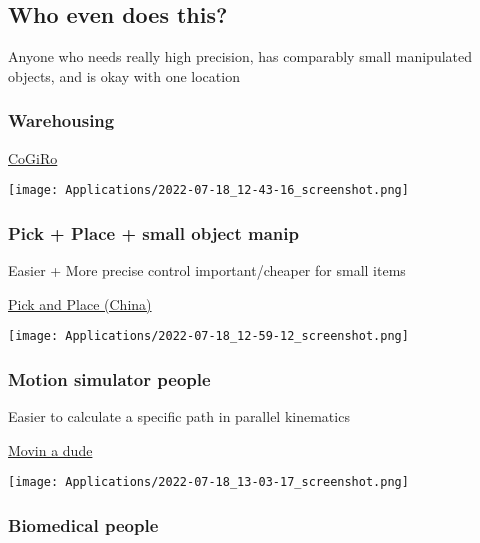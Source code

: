 \documentclass[11pt]{article}
\begin{document}
\subsection{Who even does this?}
\label{sec:org94c303a}

Anyone who needs really high precision, has comparably small manipulated objects, and is okay with one location


\subsubsection{Warehousing}
\label{sec:orgeb9c583}

\href{https://www.youtube.com/watch?v=2b4YwFZhtIE}{CoGiRo}

\begin{center}
\texttt{[image: Applications/2022-07-18\_12-43-16\_screenshot.png]}
\end{center}

\subsubsection{Pick + Place + small object manip}
\label{sec:orgdbc0c7f}

Easier + More precise control important/cheaper for small items

\href{https://www.youtube.com/watch?v=QFZMhsVn\_CE}{Pick and Place (China)}

\begin{center}
\texttt{[image: Applications/2022-07-18\_12-59-12\_screenshot.png]}
\end{center}

\subsubsection{Motion simulator people}
\label{sec:org82d6322}

Easier to calculate a specific path in parallel kinematics

\href{https://www.youtube.com/watch?v=9KMptw7ZgVI\&t=1s}{Movin a dude}

\begin{center}
\texttt{[image: Applications/2022-07-18\_13-03-17\_screenshot.png]}
\end{center}

\subsubsection{Biomedical people}
\label{sec:org8c28334}
\end{document}
